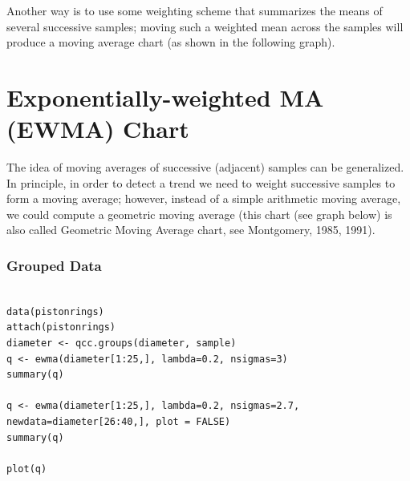 \documentclass[a4paper,12pt]{article}
\begin{document}
Another way is to use some weighting scheme that summarizes the means of several successive samples; moving such a weighted mean across the samples will produce a moving average chart (as shown in the following graph).



\section{Exponentially-weighted MA (EWMA) Chart}
The idea of moving averages of successive (adjacent) samples can be generalized. In principle, in order to detect a trend we need to weight successive samples to form a moving average; however, instead of a simple arithmetic moving average, we could compute a geometric moving average (this chart (see graph below) is also called Geometric Moving Average chart, see Montgomery, 1985, 1991).
\newpage
\subsubsection{Grouped Data}
\begin{framed}
\begin{verbatim}

data(pistonrings)
attach(pistonrings)
diameter <- qcc.groups(diameter, sample)
q <- ewma(diameter[1:25,], lambda=0.2, nsigmas=3)
summary(q)

q <- ewma(diameter[1:25,], lambda=0.2, nsigmas=2.7,
newdata=diameter[26:40,], plot = FALSE)
summary(q)

plot(q)
\end{verbatim}
\end{framed}
\end{document}
